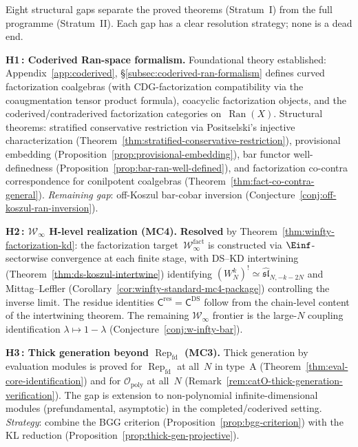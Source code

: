 \begin{remark}\label{rem:structural-gaps}
Eight structural gaps separate the proved theorems
(Stratum~I) from the full programme (Stratum~II).
Each gap has a clear resolution strategy; none is a dead end.

\smallskip\noindent
\textbf{H1\,: Coderived Ran-space formalism.}
Foundational theory established:
Appendix~\ref{app:coderived},
\S\ref{subsec:coderived-ran-formalism} defines curved
factorization coalgebras (with CDG-factorization compatibility
via the coaugmentation tensor product formula), coacyclic
factorization objects, and the coderived/contraderived
factorization categories on~$\operatorname{Ran}(X)$.  Structural
theorems: stratified conservative restriction via Positselski's
injective characterization
(Theorem~\ref{thm:stratified-conservative-restriction}),
provisional embedding
(Proposition~\ref{prop:provisional-embedding}), bar functor
well-definedness
(Proposition~\ref{prop:bar-ran-well-defined}), and factorization
co-contra correspondence for conilpotent coalgebras
(Theorem~\ref{thm:fact-co-contra-general}).
\emph{Remaining gap}: off-Koszul bar-cobar inversion
(Conjecture~\ref{conj:off-koszul-ran-inversion}).

\smallskip\noindent
\textbf{H2\,: $\mathcal{W}_\infty$ H-level realization (MC4).}
\textbf{Resolved} by Theorem~\ref{thm:winfty-factorization-kd}: the
factorization target~$\mathcal{W}_\infty^{\mathrm{fact}}$ is
constructed via $\Einf$-sectorwise convergence at each finite
stage, with DS--KD intertwining
(Theorem~\ref{thm:ds-koszul-intertwine}) identifying
$(W_N^k)^! \simeq \widehat{\mathfrak{sl}}_{N,-k-2N}$ and
Mittag--Leffler
(Corollary~\ref{cor:winfty-standard-mc4-package}) controlling the
inverse limit.  The residue identities
$\mathsf{C}^{\mathrm{res}} = \mathsf{C}^{\mathrm{DS}}$ follow
from the chain-level content of the intertwining theorem.
The remaining $\mathcal{W}_\infty$ frontier is the large-$N$
coupling identification $\lambda \mapsto 1 - \lambda$
(Conjecture~\ref{conj:w-infty-bar}).

\smallskip\noindent
\textbf{H3\,: Thick generation beyond $\operatorname{Rep}_{\mathrm{fd}}$ (MC3).}
Thick generation by evaluation modules is proved for
$\operatorname{Rep}_{\mathrm{fd}}$
at all~$N$ in type~A
(Theorem~\ref{thm:eval-core-identification}) and for
$\mathcal{O}_{\mathrm{poly}}$ at all~$N$
(Remark~\ref{rem:catO-thick-generation-verification}).
The gap is extension to non-polynomial infinite-dimensional modules
(prefundamental, asymptotic) in the completed/coderived setting.
\emph{Strategy}: combine the BGG criterion
(Proposition~\ref{prop:bgg-criterion}) with the KL reduction
(Proposition~\ref{prop:thick-gen-projective}).


\end{remark}
